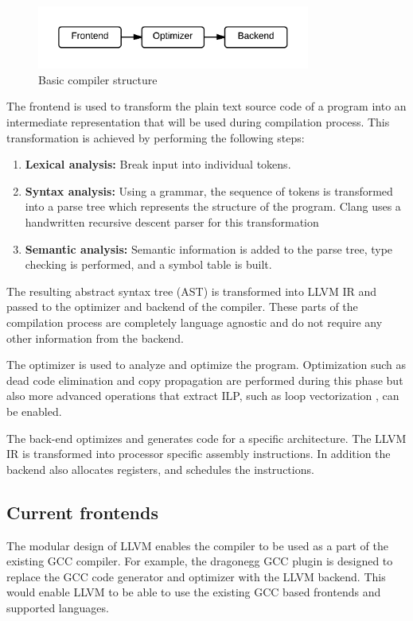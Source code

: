 
\begin{figure}[ht]
\centering
\includegraphics[width=0.8\textwidth]{2_background/img/Basic_compiler.png}
\caption{Basic compiler structure}
\label{fig:compiler_structure}
\end{figure}

The frontend is used to transform the plain text source code of a program into an intermediate representation that will be used during compilation process. This transformation is achieved by performing the following steps:

\begin{enumerate}
  \item \textbf{Lexical analysis:} Break input into individual tokens.
  \item \textbf{Syntax analysis:} Using a grammar, the sequence of tokens is transformed into a parse tree which represents the structure of the program. Clang uses a handwritten recursive descent parser for this transformation
  \item \textbf{Semantic analysis:} Semantic information is added to the parse tree, type checking is performed, and a symbol table is built.
\end{enumerate}

The resulting abstract syntax tree (AST) is transformed into LLVM IR and passed to the optimizer and backend of the compiler. These parts of the compilation process are completely language agnostic and do not require any other information from the backend.

The optimizer is used to analyze and optimize the program. Optimization such as dead code elimination and copy propagation are performed during this phase but also more advanced operations that extract ILP, such as loop vectorization \cite{llvm-loop:2014}, can be enabled.

The back-end optimizes and generates code for a specific architecture. The LLVM IR is transformed into processor specific assembly instructions. In addition the backend also allocates registers, and schedules the instructions.

\subsection{Current frontends}
The modular design of LLVM enables the compiler to be used as a part of the existing GCC compiler. For example, the dragonegg GCC plugin \cite{dragonegg:2014} is designed to replace the GCC code generator and optimizer with the LLVM backend. This would enable LLVM to be able to use the existing GCC based frontends and supported languages.


